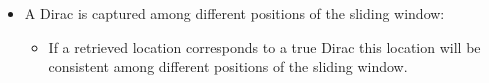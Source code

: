 \documentclass[8pt]{beamer}
\begin{document}
\begin{frame}

\begin{itemize}

\item<1-> A Dirac is captured among different positions of the sliding window:
\begin{itemize}
\item If a retrieved location corresponds to a true Dirac this location will be consistent among 
different positions of the sliding window.
\end{itemize}

\end{itemize}
\end{frame}
\end{document}
